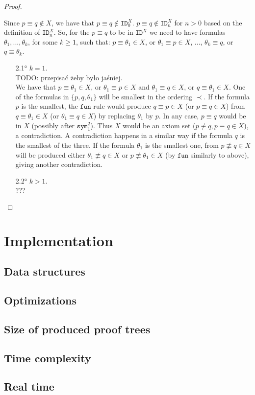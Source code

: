 \documentclass{article}
\theoremstyle{definition}
\newcommand*{\eq}{\equiv}
\newcommand*{\IDx}{\texttt{ID}^X}
\begin{document}
\begin{proof}
\begin{itemize}
            Since $p \eq q \not \in X$, we have that $p \eq q \not \in \IDx_0$. $p \eq q \not \in \IDx_n$ for $n > 0$ based on the definition of $\IDx_n$. So, for the $p \eq q$ to be in $\IDx$ we need to have formulas $\theta_1, ..., \theta_k$, for some $k \geq 1$, such that: $p \eq \theta_1 \in X$, or $\theta_1 \eq p \in X$, ..., $\theta_k \eq q$, or $q \eq \theta_k$.
            \begin{itemize}
                \item [2.1°] $k = 1$.\\
                TODO: przepisać żeby było jaśniej.\\
                We have that $p \eq \theta_1 \in X$, or $\theta_1 \eq p \in X$ and $\theta_1 \eq q \in X$, or $q \eq \theta_1 \in X$. One of the formulas in $\{p, q, \theta_1\}$ will be smallest in the ordering $\prec$. If the formula $p$ is the smallest, the $\texttt{fun}$ rule would produce $q \eq p \in X$ (or $p \eq q \in X$) from $q \eq \theta_1 \in X$ (or $\theta_1 \eq q \in X$) by replacing $\theta_1$ by $p$. In any case, $p \eq q$ would be in $X$ (possibly after $\texttt{sym}^2_1$). Thus $X$ would be an axiom set ($p\not \eq q, p \eq q \in X$), a contradiction. A contradiction happens in a similar way if the formula $q$ is the smallest of the three. If the formula $\theta_1$ is the smallest one, from $p \not \eq q \in X$ will be produced either $\theta_1 \not \eq q \in X$ or $p \not \eq \theta_1 \in X$ (by $\texttt{fun}$ similarly to above), giving another contradiction.
                \item [2.2°] $k > 1$.\\
                ???
            \end{itemize}
    \end{itemize}
\end{proof}


\section{Implementation}
\subsection{Data structures}
\subsection{Optimizations}
\subsection{Size of produced proof trees}
\subsection{Time complexity}
\subsection{Real time}
\end{document}
